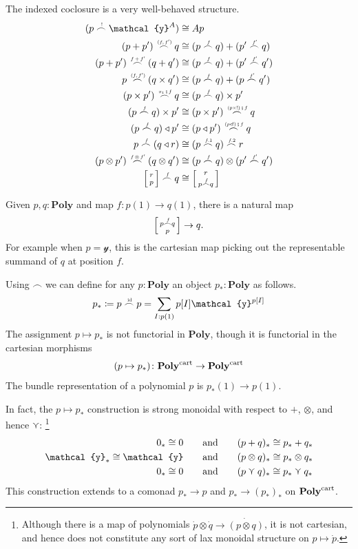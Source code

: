 \documentclass[11pt, one side, article]{memoir}
\makeatletter
\theoremstyle{definition}
\theoremstyle{plain}
\newcommand{\Cat}[1]{\mathbf{#1}}%
\newcommand{\id}{\mathrm{id}}
\newcommand{\then}{\mathbin{\fatsemi}}
\newcommand{\tn}[1]{\textnormal{#1}}
\newcommand{\yon}{{\mathcal{y}}}
\newcommand{\poly}{\Cat{Poly}}
\newcommand{\cart}{\tn{cart}}
\newcommand{\polycart}{\poly^\cart}
\newcommand{\0}{\textsf{0}}
\newcommand{\1}{\tn{\textsf{1}}}
\newcommand{\tri}{\mathbin{\triangleleft}}
\newcommand{\biglens}[2]{
     \begin{bmatrix}{\vphantom{f_f^f}#2} \\ {\vphantom{f_f^f}#1} \end{bmatrix}
}
\newcommand{\littlelens}[2]{
     \begin{bsmallmatrix}{\vphantom{f}#2} \\ {\vphantom{f}#1} \end{bsmallmatrix}
}
\newcommand{\lens}[2]{
  \relax\if@display
     \biglens{#1}{#2}
  \else
     \littlelens{#1}{#2}
  \fi
}
\newcommand{\indexcoclscale}[1]{\scalebox{.7}{#1}}
\newcommand{\cocl}[1]{
	\scriptsize\overset{\,\indexcoclscale{$#1$}}{\frown}\normalsize
}
\newcommand{\hh}[2][]{#1 \tn{#2} #1}
\newcommand{\qqand}{\hh[\qquad]{and}}
\newcommand{\OR}{\curlyvee}
\makeatother
\begin{document}
The indexed coclosure is a very well-behaved structure.
\begin{align}
	(p\cocl{!}\yon^A)&\cong Ap\\
	(p+p')\cocl{(f,f')}q&\cong(p\cocl{f}q)+(p'\cocl{f'}q)\\
	(p+p')\cocl{f+f'}(q+q')&\cong(p\cocl{f}q)+(p'\cocl{f'}q')\\
	p\cocl{(f,f')}(q\times q')&\cong(p\cocl{f}q)+(p\cocl{f'}q')\\
	(p\times p')\cocl{\pi_1\then f}q&\cong(p\cocl{f}q)\times p'\\
	(p\cocl{f}q)\times p'&\cong(p\times p')\cocl{(p\times!)\then f}q\\
	(p\cocl{f}q)\tri p'&\cong(p\tri p')\cocl{(p\tri!)\then f}q\\
	p\cocl{f}(q\tri r)&\cong(p\cocl{f.1}q)\cocl{f.2}r\\
	(p\otimes p')\cocl{f\otimes f'}(q\otimes q')&\cong(p\cocl{f}q)\otimes(p'\cocl{f'}q')\\
	\lens{p}{r}\cocl{f}q&\cong\lens{p\cocl{f}q}{r}
\end{align}

Given $p,q:\poly$ and map $f\colon p(1)\to q(1)$, there is a natural map
\begin{equation}
	\lens{p}{p\cocl{f}q}\to q.
\end{equation}
For example when $p=\yon$, this is the cartesian map picking out the representable summand of $q$ at position $f$.

Using $\frown$ we can define for any $p:\poly$ an object $p_*:\poly$ as follows.
\begin{equation}\label{eqn.p_star}
p_*\coloneqq p\cocl{\id}p=\sum_{I: p(1)}p[I]\yon^{p[I]}
\end{equation}
The assignment $p\mapsto p_*$ is not functorial in $\poly$, though it is functorial in the cartesian morphisms
\begin{equation}
	(p\mapsto p_*)\colon\polycart\to\polycart
\end{equation}
The bundle representation of a polynomial $p$ is $p_*(1)\to p(1)$.

In fact, the $p\mapsto p_*$ construction is strong monoidal with respect to $+$, $\otimes$, and hence $\OR$:%
\footnote{Although there is a map of polynomials $\dot{p}\otimes\dot{q}\to\dot{(p\otimes q)}$, it is not cartesian, and hence does not constitute any sort of lax monoidal structure on $p\mapsto\dot{p}$.}
\begin{align}
	0_*\cong 0
	&\qqand
	(p+q)_*\cong p_*+q_*\\
	\yon_*\cong\yon
	&\qqand
	(p\otimes q)_*\cong p_*\otimes q_*\\
	0_*\cong0
	&\qqand
	(p\OR q)_*\cong p_*\OR q_*
\end{align}
This construction extends to a comonad $p_*\to p$ and $p_*\to (p_*)_*$ on $\polycart$. 
\end{document}
